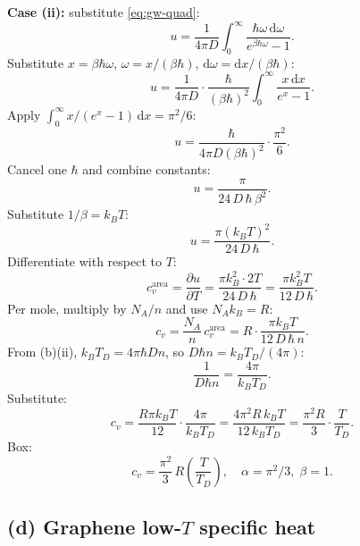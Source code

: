 \documentclass[11pt]{article}
\newcommand{\de}{\mathrm{d}}
\newcommand{\pd}[2]{\frac{\partial #1}{\partial #2}}
\begin{document}
\textbf{Case (ii):} substitute \eqref{eq:gw-quad}:
\[
u = \frac{1}{4\pi D}\int_0^\infty\!\frac{\hbar\omega\,\de\omega}{e^{\beta\hbar\omega}-1}.
\]
Substitute $x=\beta\hbar\omega$, $\omega = x/(\beta\hbar)$, $\de\omega = \de x/(\beta\hbar)$:
\[
u = \frac{1}{4\pi D}\cdot\frac{\hbar}{(\beta\hbar)^2}\int_0^\infty\!\frac{x\,\de x}{e^x-1}.
\]
Apply $\int_0^\infty x/(e^x-1)\,\de x = \pi^2/6$:
\[
u = \frac{\hbar}{4\pi D (\beta\hbar)^2}\cdot\frac{\pi^2}{6}.
\]
Cancel one $\hbar$ and combine constants:
\[
u = \frac{\pi}{24\,D\,\hbar\,\beta^2}.
\]
Substitute $1/\beta = k_BT$:
\[
u = \frac{\pi (k_B T)^2}{24\,D\,\hbar}.
\]
Differentiate with respect to $T$:
\[
c_v^\text{area} = \pd{u}{T} = \frac{\pi k_B^2 \cdot 2T}{24\,D\,\hbar} = \frac{\pi k_B^2 T}{12\,D\,\hbar}.
\]
Per mole, multiply by $N_A/n$ and use $N_A k_B = R$:
\[
c_v = \frac{N_A}{n}\,c_v^\text{area} = R\cdot\frac{\pi k_B T}{12\,D\,\hbar\,n}.
\]
From (b)(ii), $k_B T_D = 4\pi\hbar D n$, so $D\hbar n = k_B T_D/(4\pi)$:
\[
\frac{1}{D\hbar n} = \frac{4\pi}{k_B T_D}.
\]
Substitute:
\[
c_v = \frac{R\pi k_B T}{12}\cdot\frac{4\pi}{k_B T_D} = \frac{4\pi^2 R\, k_B T}{12\,k_B T_D} = \frac{\pi^2 R}{3}\cdot\frac{T}{T_D}.
\]
Box:
\[
\boxed{\;c_v = \frac{\pi^2}{3}\,R\!\left(\frac{T}{T_D}\right),\quad \alpha=\pi^2/3,\;\beta=1.\;}
\]

\subsection*{(d) Graphene low-$T$ specific heat}
\end{document}
